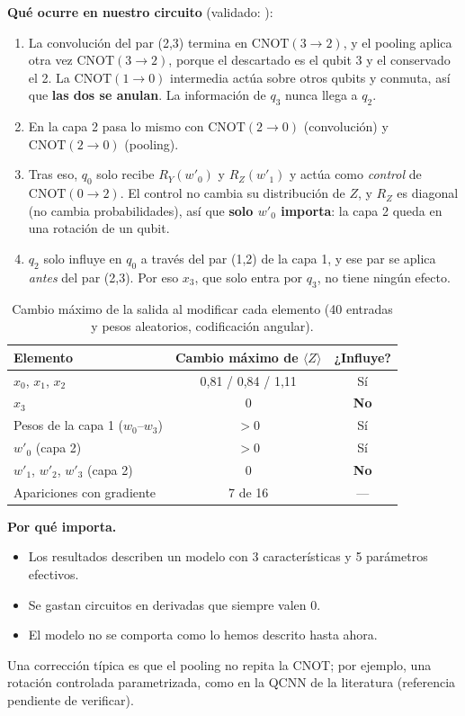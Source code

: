 \documentclass[11pt,a4paper]{article}
\begin{document}
\textbf{Qué ocurre en nuestro circuito} (validado: ):
\begin{enumerate}
  \item La convolución del par (2,3) termina en $\mathrm{CNOT}(3\to2)$, y el pooling aplica otra vez
        $\mathrm{CNOT}(3\to2)$, porque el descartado es el qubit 3 y el conservado el 2. La $\mathrm{CNOT}(1\to0)$
        intermedia actúa sobre otros qubits y conmuta, así que \textbf{las dos se anulan}. La información de $q_3$ nunca
        llega a $q_2$.
  \item En la capa 2 pasa lo mismo con $\mathrm{CNOT}(2\to0)$ (convolución) y $\mathrm{CNOT}(2\to0)$ (pooling).
  \item Tras eso, $q_0$ solo recibe $R_Y(w'_0)$ y $R_Z(w'_1)$ y actúa como \emph{control} de $\mathrm{CNOT}(0\to2)$. El
        control no cambia su distribución de $Z$, y $R_Z$ es diagonal (no cambia probabilidades), así que \textbf{solo
        $w'_0$ importa}: la capa 2 queda en una rotación de un qubit.
  \item $q_2$ solo influye en $q_0$ a través del par (1,2) de la capa 1, y ese par se aplica \emph{antes} del par (2,3).
        Por eso $x_3$, que solo entra por $q_3$, no tiene ningún efecto.
\end{enumerate}

\begin{table}[H]
\centering\small
\caption{Cambio máximo de la salida al modificar cada elemento (40 entradas y pesos aleatorios, codificación angular).}
\begin{tabular}{lcc}
\toprule
Elemento & Cambio máximo de $\langle Z\rangle$ & ¿Influye? \\
\midrule
$x_0$, $x_1$, $x_2$ & 0,81 / 0,84 / 1,11 & Sí \\
$x_3$ & 0 & \textbf{No} \\
Pesos de la capa 1 ($w_0$--$w_3$) & $> 0$ & Sí \\
$w'_0$ (capa 2) & $> 0$ & Sí \\
$w'_1$, $w'_2$, $w'_3$ (capa 2) & 0 & \textbf{No} \\
Apariciones con gradiente & 7 de 16 & --- \\
\bottomrule
\end{tabular}
\end{table}

\textbf{Por qué importa.}
\begin{itemize}
  \item Los resultados describen un modelo con 3 características y 5 parámetros efectivos.
  \item Se gastan circuitos en derivadas que siempre valen 0.
  \item El modelo no se comporta como lo hemos descrito hasta ahora.
\end{itemize}
Una corrección típica es que el pooling no repita la CNOT; por ejemplo, una rotación controlada parametrizada, como en
la QCNN de la literatura (referencia pendiente de verificar).
\end{document}
